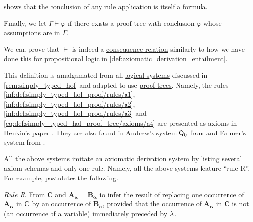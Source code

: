 \begin{definition}
\begin{thmenum}[series=def:simply_typed_hol_proof_tree]
     shows that the conclusion of any rule application is itself a formula.

     Finally, we let \( \Gamma \vdash \varphi \) if there exists a proof tree with conclusion \( \varphi \) whose assumptions are in \( \Gamma \).
  \end{thmenum}
\end{definition}
\begin{defproof}
  We can prove that \( {\vdash} \) is indeed a \hyperref[def:consequence_relation]{consequence relation} similarly to how we have done this for propositional logic in \cref{def:axiomatic_derivation_entailment}.
\end{defproof}
\begin{comments}
  \item This definition is amalgamated from all \hyperref[con:logical_system]{logical systems} discussed in \cref{rem:simply_typed_hol} and adapted to use \hyperref[con:proof_tree]{proof trees}. Namely, the rules \ref{inf:def:simply_typed_hol_proof/rules/a1}, \ref{inf:def:simply_typed_hol_proof/rules/a2}, \ref{inf:def:simply_typed_hol_proof/rules/a3} and \eqref{eq:def:simply_typed_hol_proof_tree/axioms/a4} are presented as axioms in Henkin's paper \cite[37]{Henkin1975Identity}. They are also found in Andrew's system \( \textsf{\upshape Q}_0 \) from \cite[\S 51]{Andrews2002Logic} and Farmer's system from \cite[278]{Farmer2008STTVirtues}.

  All the above systems imitate an axiomatic derivation system by listing several axiom schemas and only one rule. Namely, all the above systems feature \enquote{rule R}. For example,  postulates the following:
  \begin{displayquote}
    \textit{Rule R}. From \( \mathbf{C} \) and \( \mathbf{A_\alpha} = \mathbf{B_\alpha} \) to infer the result of replacing one occurrence of \( \mathbf{A_\alpha} \) in \( \mathbf{C} \) by an occurrence of \( \mathbf{B_\alpha} \), provided that the occurrence of \( \mathbf{A_\alpha} \) in \( \mathbf{C} \) is not (an occurrence of a variable) immediately preceded by \( {\mathrm \lambda} \).
  \end{displayquote}


\end{comments}
